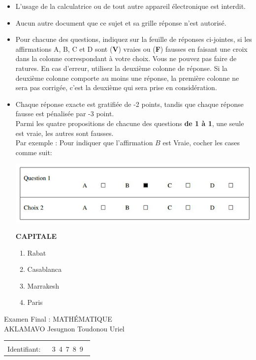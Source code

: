 \documentclass{book}%
\begin{document}
\begin{itemize}%
\item%
L'usage de la calculatrice ou de tout autre appareil électronique est interdit.%
\item%
Aucun autre document que ce sujet et sa grille réponse n'est autorisé.%
\item%
Pour chacune des questions, indiquez sur la feuille de réponses ci-jointes, si les affirmations A, B, C et D sont (\textbf{V}) vraies ou (\textbf{F}) fausses en faisant une croix dans la colonne correspondant à votre choix. Vous ne pouvez pas faire de ratures. En cas d'erreur, utilisez la deuxième colonne de réponse. Si la deuxième colonne comporte au moins une réponse, la première colonne ne sera pas corrigée, c'est la deuxième qui sera prise en considération.%
\item%
Chaque réponse exacte est gratifiée de -2 points, tandis que chaque réponse fausse est pénalisée par -3 point. \\ 	Parmi les quatre propositions de chacune des questions \textbf{de 1 à 1}, une seule est vraie, les autres sont fausses. \\ 	Par exemple : Pour indiquer que l'affirmation $B$ est Vraie, cocher les cases comme suit:  \\ \begin{center}	\includegraphics[scale=0.8]{reponses.png} \end{center}%
\thispagestyle{empty}%
\begin{exercise}%
\textbf{CAPITALE }%
\begin{enumerate}[label=\textbf{\Alph*. }]%
\item%
Rabat%
\item%
Casablanca%
\item%
Marrakesh%
\item%
Paris%
\end{enumerate}%
\end{exercise}%
\end{itemize}%
\newpage%
\thispagestyle{empty}%
Examen Final : MATHÉMATIQUE $\qquad \qquad \qquad \qquad \qquad \qquad \qquad \qquad$ AKLAMAVO Jesugnon Toudonou Uriel%
\begin{flushright}%
\begin{tabular}{|l|}%
\hline%
 \\%
\thispagestyle{empty}%
Identifiant: $\quad$ {\Large 3~4~7~8~9~}%
 \\%
\hline%
\end{tabular}%
\end{flushright}%
\end{document}
